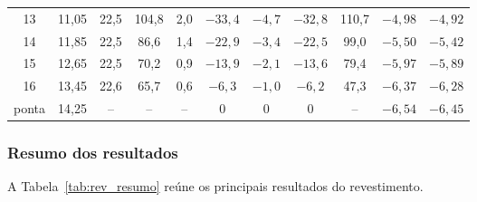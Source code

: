 \begin{table}[H]
\begin{tabular}{ccccccccccc}
13 & 11{,}05 & 22{,}5 & 104{,}8 & 2{,}0 & $-33{,}4$ & $-4{,}7$ & $-32{,}8$ & 110{,}7 & $-4{,}98$ & $-4{,}92$ \\
14 & 11{,}85 & 22{,}5 & 86{,}6 & 1{,}4 & $-22{,}9$ & $-3{,}4$ & $-22{,}5$ & 99{,}0 & $-5{,}50$ & $-5{,}42$ \\
15 & 12{,}65 & 22{,}5 & 70{,}2 & 0{,}9 & $-13{,}9$ & $-2{,}1$ & $-13{,}6$ & 79{,}4 & $-5{,}97$ & $-5{,}89$ \\
16 & 13{,}45 & 22{,}6 & 65{,}7 & 0{,}6 & $-6{,}3$ & $-1{,}0$ & $-6{,}2$ & 47{,}3 & $-6{,}37$ & $-6{,}28$ \\
\midrule
ponta & 14{,}25 & -- & -- & -- & $0$ & $0$ & $0$ & -- & $-6{,}54$ & $-6{,}45$ \\
\bottomrule
\end{tabular}
\end{table}
 
\subsubsection{Resumo dos resultados}
 
A Tabela~\ref{tab:rev_resumo} reúne os principais resultados do revestimento.
 

